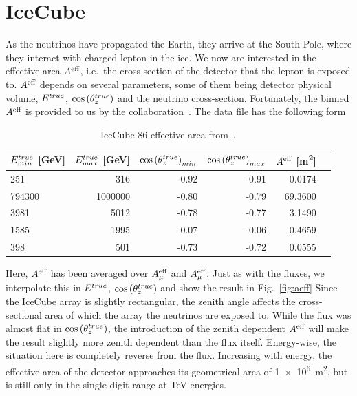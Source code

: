 % 
% 

\section{IceCube}\label{ch:ICmethod}
As the neutrinos have propagated the Earth, they arrive at the South Pole, where they interact with charged lepton in the ice. We now are interested in the effective area $A^\text{eff}$, 
i.e.~the cross-section of the detector that the lepton is exposed to.
$A^\text{eff}$ depends on several parameters, some of them being detector physical volume, $E^{true}$, $\cos{(\theta_z^{true})}$ and the neutrino cross-section. 
Fortunately, the binned $A^\text{eff}$ is provided to us by the collaboration~\cite{ICaeff}.
The data file has the following form

\begin{table}[ht]
    \centering
    \begin{tabular}{lrrrrr}
        \hline \hline
        $E^{true}_{min}$ [\si{\GeV}] &     $E^{true}_{max}$ [\si{\GeV}]&   $\cos{(\theta_z^{true})}_{min}$ &   $\cos{(\theta_z^{true})}_{max}$ &     $A^\text{eff}$ [\si{\metre\squared}] \\
        \hline
             251 &      316 &  -0.92 &  -0.91 &   0.0174 \\
          794300 &  1000000 &  -0.80 &  -0.79 &  69.3600 \\
            3981 &     5012 &  -0.78 &  -0.77 &   3.1490 \\
            1585 &     1995 &  -0.07 &  -0.06 &   0.4659 \\
            398 &      501 &  -0.73 &  -0.72 &   0.0555 \\
        \hline \hline
        \end{tabular}
    \caption{IceCube-86 effective area from~\cite{ICaeff}.}
    \label{table:aeff}
\end{table}

Here, $A^\text{eff}$ has been averaged over $A^\text{eff}_\mu$ and $A^\text{eff}_{\bar{\mu}}$.
Just as with the fluxes, we interpolate this in $E^{true}$, $\cos{(\theta_z^{true})}$ and show the result in Fig.~\ref{fig:aeff}
Since the IceCube array is slightly rectangular, the zenith angle affects the cross-sectional area of which the array the neutrinos are exposed to.
While the flux was almost flat in $\cos{(\theta_z^{true})}$, the introduction of the zenith dependent $A^\text{eff}$ will make the result slightly more zenith dependent than 
the flux itself. Energy-wise, the situation here is completely reverse from the flux. Increasing with energy, the effective area of the detector
approaches its geometrical area of \SI{1e6}{\metre^2}, but is still only in the single digit range at \si{\TeV} energies.

